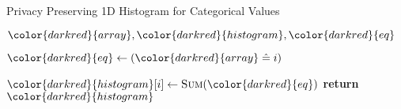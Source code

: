 \begin{algorithm}[H]
\caption{Privacy Preserving 1D Histogram for Categorical Values}\label{a:1d-histogram-categorical}
\begin{algorithmic}[1]
\renewcommand{\algorithmicrequire}{\textbf{Private Vars:}}
\Require ${\color{darkred}{array}}, {\color{darkred}{histogram}}, {\color{darkred}{eq}}$

        \State ${\color{darkred}{eq}} \gets ({\color{darkred}{array}} \heq i)$

        \State ${\color{darkred}{histogram}}[i] \gets
        \textsc{Sum}({\color{darkred}{eq}})$
    \EndFor
    \State \textbf{return} {${\color{darkred}{histogram}}$}
\EndProcedure

\begin{spacing}{0.5}
\end{spacing}


\end{algorithmic}
\end{algorithm}

